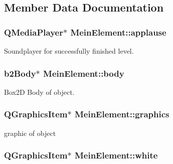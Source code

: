 \subsection{Member Data Documentation}
\subsubsection[{\texorpdfstring{applause}{applause}}]{\setlength{\rightskip}{0pt plus 5cm}Q\+Media\+Player$\ast$ Mein\+Element\+::applause}\hypertarget{class_mein_element_a04019be8ecb452cf4ee984efed24e9e1}{}\label{class_mein_element_a04019be8ecb452cf4ee984efed24e9e1}


Soundplayer for successfully finished level. 

\subsubsection[{\texorpdfstring{body}{body}}]{\setlength{\rightskip}{0pt plus 5cm}b2\+Body$\ast$ Mein\+Element\+::body}\hypertarget{class_mein_element_a05117e05589fc0a4b1e144511fbd3eec}{}\label{class_mein_element_a05117e05589fc0a4b1e144511fbd3eec}


Box2D Body of object. 

\subsubsection[{\texorpdfstring{graphics}{graphics}}]{\setlength{\rightskip}{0pt plus 5cm}Q\+Graphics\+Item$\ast$ Mein\+Element\+::graphics}\hypertarget{class_mein_element_a6d0a318f2e37f3633f7cf6fc20e83531}{}\label{class_mein_element_a6d0a318f2e37f3633f7cf6fc20e83531}


graphic of object 

\subsubsection[{\texorpdfstring{white}{white}}]{\setlength{\rightskip}{0pt plus 5cm}Q\+Graphics\+Item$\ast$ Mein\+Element\+::white}\hypertarget{class_mein_element_a4811ea6a6c50dfad16c39bbaa9a758b8}{}\label{class_mein_element_a4811ea6a6c50dfad16c39bbaa9a758b8}


